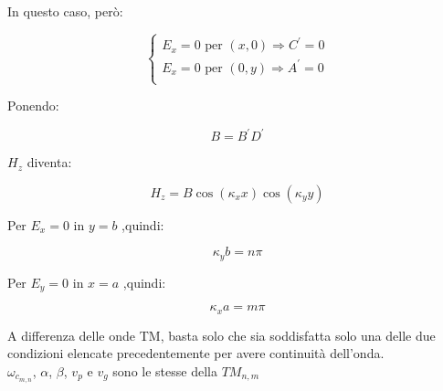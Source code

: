 In questo caso, però: 

{
    \Large
    \begin{equation}
        \begin{cases}
            E_x = 0 \text{  per } (x, 0) \Rightarrow C^{'} = 0 \\ 
            E_x = 0 \text{  per } (0, y) \Rightarrow A^{'} = 0 \\ 
        \end{cases}
    \end{equation}
}

Ponendo: 

{
    \Large 
    \begin{equation}
        B = B^{'}D^{'}
    \end{equation}
}

$H_z$ diventa: 

{
    \Large 
    \begin{equation}
        H_z = B \cos(\kappa_x x)\cos(\kappa_y y)
    \end{equation}
}

Per $E_x = 0$ in $y=b$ ,quindi: 

{
    \Large
    \begin{equation}
        \kappa_y b = n \pi
    \end{equation}
}

Per $E_y = 0$ in $x=a$ ,quindi: 

{
    \Large
    \begin{equation}
        \kappa_x a = m \pi
    \end{equation}
}

A differenza delle onde TM, basta solo che sia soddisfatta 
solo una delle due condizioni elencate precedentemente per avere continuità 
dell'onda. \\ 

$\omega_{c_{m,n}}$, $\alpha$, $\beta$, $v_p$ e $v_g$ sono le stesse della $TM_{n, m}$ 

\newpage 

